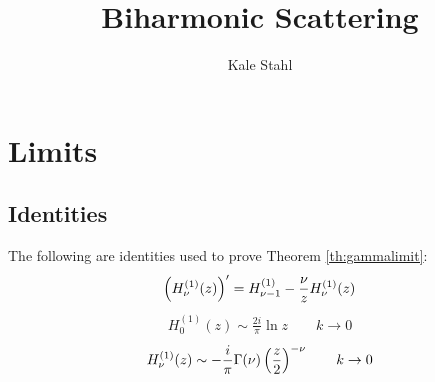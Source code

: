 \documentclass[]{article}
\title{Biharmonic Scattering}
\author{Kale Stahl}
\begin{document}
	
	\maketitle
	\section{Limits}
	\subsection{Identities}
	The following are identities used to prove Theorem \ref{th:gammalimit}:
	\begin{align}
		\left( {H^{(1)}_\nu(z)} \right)^\prime = H^{(1)}_{\nu -1}- \frac{\nu}{z}H^{(1)}_\nu(z)
	\end{align}
	\begin{align}
		H_0^{(1)}(z) \sim \frac{2i}{\pi}\ln z \qquad k\to 0
	\end{align}
		\begin{align}
		H_\nu^{(1)}(z) \sim -\frac{i}{\pi}\Gamma(\nu)\left( {\frac{z}{2}} \right)^{-\nu} \qquad k\to 0
	\end{align}
\end{document}
